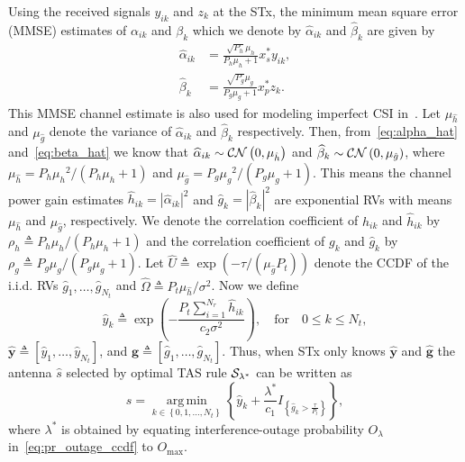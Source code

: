 \documentclass[12pt,draftcls,peerreview,onecolumn]{IEEEtran}
\newcommand{\cbrac}[1]{\left\{{#1}\right\}}
\newcommand{\indic}[1]{I_{\cbrac{#1}}}
\newcommand{\CN}{{\cal CN}}
\newcommand{\define}{\triangleq}
\DeclareMathOperator*{\argmin}{arg\,min}
\newcommand{\nx}{{0}}
\newcommand{\lam}{\lambda}
\newcommand{\lamstar}{\lam^{*}}
\newcommand{\mug}{{\mu_{g}}}
\newcommand{\muh}{{\mu_{h}}}
\newcommand{\Nt}{{N_t}}
\newcommand{\Nr}{{N_r}}
\newcommand{\Pt}{{P_t}}
\newcommand{\such}{h}
\newcommand{\puch}{g}
\newcommand{\hk}[1]{{\such_{#1}}}
\newcommand{\gk}[1]{{\puch_{#1}}}
\newcommand{\ghatvec}{\mathbf{\hat{\puch}}}
\newcommand{\yhatvec}{\mathbf{\hat{y}}}
\newcommand{\noisevar}{\sigma^2}
\newcommand{\outmax}{O_{\text{max}}}
\newcommand{\itau}{\tau}
\newcommand{\cone}{c_{1}}
\newcommand{\ctwo}{c_{2}}
\newcommand{\out}{O}
\newcommand{\m}{\cone}
\newcommand{\taubypt}{\frac{\itau}{\Pt}}
\newcommand{\gkhatgrtaubypt}[1]{{\gkhat{#1}}>\taubypt}
\newcommand{\ghatindic}[1]{\indic{\gkhatgrtaubypt{#1}}}
\newcommand{\lamstarbym}{\frac{\lamstar}{\m}}
\newcommand{\ykhatplusgkhat}[1]{ \ykhat{#1} + \lamstarbym\ghatindic{#1}}
\newcommand{\snr}{\Omega}
\newcommand{\un}{U}
\newcommand{\allopts}{\left\{\nx,1,\ldots,\Nt\right\}}
\newcommand{\outlam}{\out_{\lam}}
\newcommand{\callamstarrule}{\cal S_{\lam^{*}}}
\newcommand{\sug}{\alpha}
\newcommand{\pug}{\beta}
\newcommand{\sugain}[1]{\sug_{#1}}
\newcommand{\pugain}[1]{\pug_{#1}}
\newcommand{\sugainhat}[1]{\widehat{\sug}_{#1}}
\newcommand{\pugainhat}[1]{\widehat{\pug}_{#1}}
\newcommand{\unhat}{\widehat{\un}}
\newcommand{\snrhat}{\widehat{\snr}}
\newcommand{\gpilotpower}{P_g}
\newcommand{\hpilotpower}{P_h}
\newcommand{\hhat}{\hat{\such}}
\newcommand{\ghat}{\hat{\puch}}
\newcommand{\shat}{\hat{s}}
\newcommand{\hkhat}[1]{\hhat_{#1}}
\newcommand{\gkhat}[1]{\ghat_{#1}}
\newcommand{\ykhat}[1]{\hat{y}_{#1}}
\newcommand{\muhhat}{\mu_{\hhat}}
\newcommand{\mughat}{\mu_{\ghat}}
\newcommand{\ccdfghatinline}{\exp\left( {-{\itau}/{\left( \mughat\Pt\right) }}\right) }
\newcommand{\rhog}{\rho_g}
\newcommand{\rhoh}{\rho_h}
\newcommand{\hpilotsym}{x_{s}}
\newcommand{\gpilotsym}{x_{p}}
\newcommand{\hpilotrcv}{y_{ik}}
\newcommand{\gpilotrcv}{z_{k}}
\begin{document}
Using the received signals $\hpilotrcv$ and $\gpilotrcv$  at the STx, the minimum mean square error (MMSE) estimates of $\sugain{ik}$ and $\pugain{k}$ which we denote by $\sugainhat{ik}$ and $\pugainhat{k}$ are given by 
%
\begin{align}
\label{eq:alpha_hat}
\sugainhat{ik} &= \frac{\sqrt{\hpilotpower}\muh}{\hpilotpower\muh + 1}  \hpilotsym^{*} \hpilotrcv,\\
\label{eq:beta_hat} 
\pugainhat{k} &= \frac{\sqrt{\gpilotpower}\mug}{\gpilotpower\mug + 1}  \gpilotsym^{*} \gpilotrcv.
\end{align}
%
This MMSE channel estimate is also used for modeling imperfect CSI in~\cite{XKang_2011_JSAC,Kashyap_2014_TCOM,Rezki_2012_ieeeVt}. Let $\muhhat$ and $\mughat$ denote the variance of $\sugainhat{ik}$ and $\pugainhat{k}$ respectively. 
Then, from~\eqref{eq:alpha_hat} and~\eqref{eq:beta_hat} we know that $\sugainhat{ik}\sim\CN\left(0, \muhhat \right)$ and $\pugainhat{k}\sim \CN\left(0, \mughat\right) $, where  $\muhhat ={\hpilotpower\muh^2}/{\left( \hpilotpower\muh+1\right)}$ and $\mughat = {\gpilotpower\mug^2}/{\left( \gpilotpower\mug+1\right)}$. This means the channel power gain estimates $\hkhat{ik}=|\sugainhat{ik}|^2$ and $\gkhat{k}=|\pugainhat{k}|^2$ are exponential RVs with means $\muhhat$ and $\mughat$, respectively. We denote the correlation coefficient of $\hk{ik}$ and $\hkhat{ik}$ by $\rhoh\define{\hpilotpower\muh}/{\left( \hpilotpower\muh + 1\right) }$ and the correlation coefficient of $\gk{k}$ and $\gkhat{k}$ by $\rhog \define{\gpilotpower\mug}/{\left( \gpilotpower\mug + 1\right) }$. Let  $\unhat\define\ccdfghatinline$ denote the CCDF of the i.i.d. RVs $\gkhat{1},\ldots,\gkhat{\Nt}$ and $\snrhat\define{\Pt\muhhat}/{\noisevar}$.
Now we define 
\begin{equation}
\ykhat{k} \define  \exp\left({- \frac{\Pt\sum_{i=1}^{\Nr}\hkhat{ik}}{\ctwo\noisevar} }\right), \quad \text{for} \quad 0\leq k \leq\Nt,
\label{eq:yihat_def}
\end{equation}
$\yhatvec\define\left[\ykhat{1},\ldots,\ykhat{\Nt} \right]$, and $\ghatvec\define\left[\gkhat{1},\ldots,\gkhat{\Nt} \right]$.
Thus, when STx only knows $\yhatvec$ and $\ghatvec$  the antenna $\shat$ selected by optimal TAS rule $\callamstarrule$ can be written as 
\begin{equation}
\shat=\argmin\limits_{k\in\allopts} \left\{ \ykhatplusgkhat{k} \right\},
\label{eq:shat}
\end{equation}
where $\lamstar$ is obtained by equating interference-outage probability $\outlam$ in~\eqref{eq:pr_outage_ccdf} to $\outmax$. 
\end{document}
